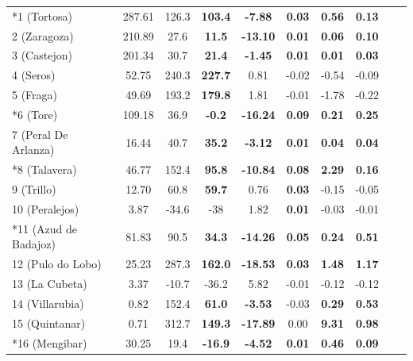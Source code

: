 \begin{table}[hbtp]
{\begin{tabular}{lccccccccc}
        \midrule
        *1 (Tortosa)        & 287.61  & 126.3 & \textbf{103.4} & \textbf{-7.88} & \textbf{0.03}  & \textbf{0.56}  & \textbf{0.13}  \\
        2 (Zaragoza)        & 210.89  & 27.6 & \textbf{11.5}   & \textbf{-13.10}  & \textbf{0.01}  & \textbf{0.06}  & \textbf{0.10}  \\
        3 (Castejon)        & 201.34  & 30.7 & \textbf{21.4}   & \textbf{-1.45}  & \textbf{0.01}  & \textbf{0.01}  & \textbf{0.03}  \\
        4 (Seros)           & 52.75   & 240.3 & \textbf{227.7} & 0.81   & -0.02 & -0.54 & -0.09 \\
        5 (Fraga)           & 49.69   & 193.2 & \textbf{179.8} & 1.81   & -0.01 & -1.78 & -0.22 \\
        *6 (Tore)           & 109.18  & 36.9 & \textbf{-0.2}   & \textbf{-16.24} & \textbf{0.09}  & \textbf{0.21}  & \textbf{0.25}  \\
        7 (Peral De Arlanza) & 16.44  & 40.7 & \textbf{35.2}   & \textbf{-3.12}  & \textbf{0.01}  & \textbf{0.04}  & \textbf{0.04}  \\
        *8 (Talavera)       & 46.77   & 152.4 & \textbf{95.8}  & \textbf{-10.84} & \textbf{0.08}  & \textbf{2.29}  & \textbf{0.16}  \\
        9 (Trillo)          & 12.70   & 60.8 & \textbf{59.7}   & 0.76   & \textbf{0.03}  & -0.15 & -0.05 \\
        10 (Peralejos)      & 3.87    & -34.6 & -38            & 1.82   & \textbf{0.01}  & -0.03 & -0.01 \\
        *11 (Azud de Badajoz) & 81.83 & 90.5 & \textbf{34.3}   & \textbf{-14.26} & \textbf{0.05}  & \textbf{0.24}  & \textbf{0.51}  \\
        12 (Pulo do Lobo)   & 25.23   & 287.3 & \textbf{162.0} & \textbf{-18.53} & \textbf{0.03}  & \textbf{1.48}  & \textbf{1.17}  \\
        13 (La Cubeta)      & 3.37    & -10.7 & -36.2          & 5.82   & -0.01 & -0.12 & -0.12 \\
        14 (Villarubia)     & 0.82    & 152.4 & \textbf{61.0}  & \textbf{-3.53} & -0.03 & \textbf{0.29}  & \textbf{0.53}  \\
        15 (Quintanar)      & 0.71    & 312.7 & \textbf{149.3} & \textbf{-17.89} & 0.00  & \textbf{9.31}  & \textbf{0.98}  \\
        *16 (Mengibar)      & 30.25   & 19.4 & \textbf{-16.9}  & \textbf{-4.52} & \textbf{0.01}  & \textbf{0.46}  & \textbf{0.09}  \\

\end{tabular}}
\end{table}

